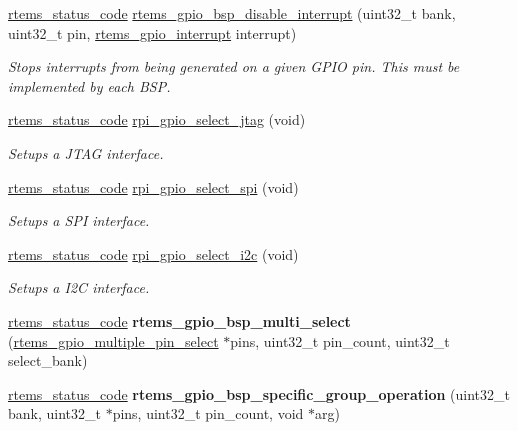 \begin{DoxyCompactItemize}
\mbox{\hyperlink{group__ClassicStatus_ga545d41846817eaba6143d52ee4d9e9fe}{rtems\+\_\+status\+\_\+code}} \mbox{\hyperlink{rpi-gpio_8c_a922ef6b0b9a1bc76d2a3cdf2eaef670d}{rtems\+\_\+gpio\+\_\+bsp\+\_\+disable\+\_\+interrupt}} (uint32\+\_\+t bank, uint32\+\_\+t pin, \mbox{\hyperlink{gpio_8h_a941c7497a28a335b0b05e1ebfd471ddc}{rtems\+\_\+gpio\+\_\+interrupt}} interrupt)
\begin{DoxyCompactList}\small\item\em Stops interrupts from being generated on a given G\+P\+IO pin. This must be implemented by each B\+SP. \end{DoxyCompactList}\item 
\mbox{\hyperlink{group__ClassicStatus_ga545d41846817eaba6143d52ee4d9e9fe}{rtems\+\_\+status\+\_\+code}} \mbox{\hyperlink{rpi-gpio_8c_ab31aee23a17b307e47076c1877f5736e}{rpi\+\_\+gpio\+\_\+select\+\_\+jtag}} (void)
\begin{DoxyCompactList}\small\item\em Setups a J\+T\+AG interface. \end{DoxyCompactList}\item 
\mbox{\hyperlink{group__ClassicStatus_ga545d41846817eaba6143d52ee4d9e9fe}{rtems\+\_\+status\+\_\+code}} \mbox{\hyperlink{rpi-gpio_8c_a2546c0dc5eb7c840fe712e9ac748e6a9}{rpi\+\_\+gpio\+\_\+select\+\_\+spi}} (void)
\begin{DoxyCompactList}\small\item\em Setups a S\+PI interface. \end{DoxyCompactList}\item 
\mbox{\hyperlink{group__ClassicStatus_ga545d41846817eaba6143d52ee4d9e9fe}{rtems\+\_\+status\+\_\+code}} \mbox{\hyperlink{rpi-gpio_8c_adf19e397f4bfdb38d6d75a604e7373d1}{rpi\+\_\+gpio\+\_\+select\+\_\+i2c}} (void)
\begin{DoxyCompactList}\small\item\em Setups a I2C interface. \end{DoxyCompactList}\item 
\mbox{\label{rpi-gpio_8c_ae31ba07e917746a29e7cd061e941f834}} 
\mbox{\hyperlink{group__ClassicStatus_ga545d41846817eaba6143d52ee4d9e9fe}{rtems\+\_\+status\+\_\+code}} {\bfseries rtems\+\_\+gpio\+\_\+bsp\+\_\+multi\+\_\+select} (\mbox{\hyperlink{structrtems__gpio__multiple__pin__select}{rtems\+\_\+gpio\+\_\+multiple\+\_\+pin\+\_\+select}} $\ast$pins, uint32\+\_\+t pin\+\_\+count, uint32\+\_\+t select\+\_\+bank)
\item 
\mbox{\label{rpi-gpio_8c_af9faec34c779e654ecca12d548e22fe4}} 
\mbox{\hyperlink{group__ClassicStatus_ga545d41846817eaba6143d52ee4d9e9fe}{rtems\+\_\+status\+\_\+code}} {\bfseries rtems\+\_\+gpio\+\_\+bsp\+\_\+specific\+\_\+group\+\_\+operation} (uint32\+\_\+t bank, uint32\+\_\+t $\ast$pins, uint32\+\_\+t pin\+\_\+count, void $\ast$arg)
\end{DoxyCompactItemize}
